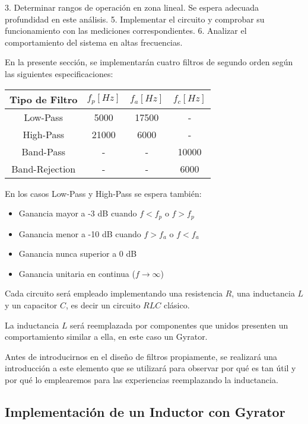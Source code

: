 3. Determinar rangos de operación en zona lineal. Se espera adecuada profundidad en este análisis.
5. Implementar el circuito y comprobar su funcionamiento con las mediciones correspondientes.
6. Analizar el comportamiento del sistema en altas frecuencias.

En la presente sección, se implementarán cuatro filtros de segundo orden según las siguientes especificaciones:

\begin{table}[H]
    \centering
    \begin{tabular}{|c|c|c|c|}
    \hline
    \rowcolor[HTML]{C0C0C0} 
    Tipo de Filtro & $f_p[Hz]$ & $f_a[Hz]$ & $f_c[Hz]$ \\ \hline
    Low-Pass       & 5000   & 17500  & -      \\ \hline
    High-Pass      & 21000   & 6000   & -      \\ \hline
    Band-Pass      & -      & -      & 10000  \\ \hline
    Band-Rejection & -      & -      & 6000   \\ \hline
    \end{tabular}
    \end{table}

En los casos Low-Pass y High-Pass se espera también:

\begin{itemize}
	\item Ganancia mayor a -3 dB cuando $f < f_p$ o $f > f_p$ 
	\item Ganancia menor a -10 dB cuando $f > f_a$ o $f < f_a$
	\item Ganancia nunca superior a 0 dB
	\item Ganancia unitaria en continua ($f \to \infty$)
\end{itemize}

Cada circuito será empleado implementando una resistencia $R$, una inductancia $L$ y un capacitor $C$, es decir un circuito $RLC$
clásico. 

La inductancia $L$ será reemplazada por componentes que unidos presenten un comportamiento similar a ella, en este caso
un Gyrator. 

Antes de introducirnos en el diseño de filtros propiamente, se realizará una introducción a este elemento que se utilizará para observar
por qué es tan útil y por qué lo emplearemos para las experiencias reemplazando la inductancia.

\subsection{Implementación de un Inductor con Gyrator}

